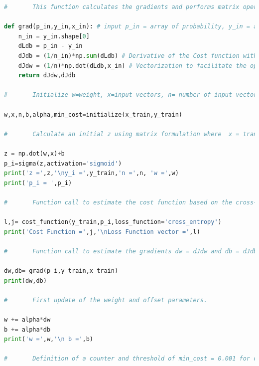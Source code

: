 \documentclass{article}
\begin{document}
\begin{lstlisting}[language=Python]
#		This function calculates the gradients and performs matrix operations to estimate the partial derivatives. dLdb represents the derivative of the loss function with respect to the offset parameter b. dJdb = derivative of the cost function with respect to b and dJdw = derivative of the cost function with respect to a specific j-th weight. Numpy library was used for vectorization and to perform element-wise operations instead of for loops.  

def grad(p_in,y_in,x_in): # input p_in = array of probability, y_in = array of classes, x_in = matrix array.
    n_in = y_in.shape[0]
    dLdb = p_in - y_in
    dJdb = (1/n_in)*np.sum(dLdb) # Derivative of the Cost function with respect to offset  
    dJdw = (1/n)*np.dot(dLdb,x_in) # Vectorization to facilitate the operations and automatically perform the sum.
    return dJdw,dJdb
 
# 		Initialize w=weight, x=input vectors, n= number of input vectors in the data set, alpha = learning rate, min_cost = control variable

w,x,n,b,alpha,min_cost=initialize(x_train,y_train)

# 		Calculate an initial z using matrix formulation where  x = transpose of x_train. Here we also calculate the sigmoid for each z and print the values.

z = np.dot(w,x)+b
p_i=sigma(z,activation='sigmoid')
print('z =',z,'\ny_i =',y_train,'n =',n, 'w =',w)
print('p_i = ',p_i)

#		Function call to estimate the cost function based on the cross-entropy loss function and print both the cost function and the loss function. l = loss function, j = cost function

l,j= cost_function(y_train,p_i,loss_function='cross_entropy') 
print('Cost Function =',j,'\nLoss Function vector =',l)

#		Function call to estimate the gradients dw = dJdw and db = dJdb. These values are used to update the parameter of the model.

dw,db= grad(p_i,y_train,x_train)
print(dw,db)

#		First update of the weight and offset parameters.

w += alpha*dw
b += alpha*db
print('w =',w,'\n b =',b)

#		Definition of a counter and threshold of min_cost = 0.001 for convergence. This means that the parameters of the model are optimized. All the previous operations are performed inside the loop until the break of the self-consistent while-loop.


\end{lstlisting}
\end{document}
